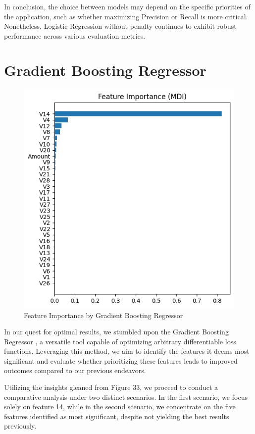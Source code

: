 \documentclass[conference]{IEEEtran}
\begin{document}
In conclusion, the choice between models may depend on the specific priorities of the application, such as whether maximizing Precision or Recall is more critical. Nonetheless, Logistic Regression without penalty continues to exhibit robust performance across various evaluation metrics.

\section{Gradient Boosting Regressor}

\begin{figure}[H]
    \centering
    \includegraphics[width=1\linewidth]{images/FeatureImportanceGBR.png}
    \caption{Feature Importance by Gradient Boosting Regressor}
    \label{fig:NN-Confusion-AllFeatures}
\end{figure}


In our quest for optimal results, we stumbled upon the Gradient Boosting Regressor \cite{b16}, a versatile tool capable of optimizing arbitrary differentiable loss functions. Leveraging this method, we aim to identify the features it deems most significant and evaluate whether prioritizing these features leads to improved outcomes compared to our previous endeavors.

Utilizing the insights gleaned from Figure 33, we proceed to conduct a comparative analysis under two distinct scenarios. In the first scenario, we focus solely on feature 14, while in the second scenario, we concentrate on the five features identified as most significant, despite not yielding the best results previously.
\end{document}
